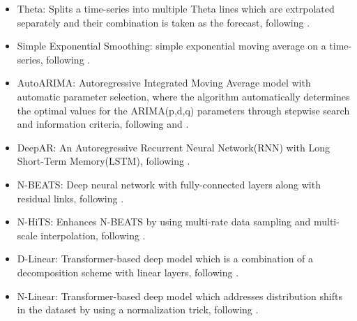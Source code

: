 \documentclass{article}
\begin{document}
\begin{itemize}
    \item Theta: Splits a time-series into multiple Theta lines which are extrpolated separately and their combination is taken as the forecast, following \cite{Assimakopoulos2000}.
    \item Simple Exponential Smoothing: simple exponential moving average on a time-series, following \cite{Brown2004}.
    \item AutoARIMA: Autoregressive Integrated Moving Average model with automatic parameter selection, where the algorithm automatically determines the optimal values for the ARIMA(p,d,q) parameters through stepwise search and information criteria, following \cite{Box2013} and \cite{Hyndman2008}.
    \item DeepAR: An Autoregressive Recurrent Neural Network(RNN) with Long Short-Term Memory(LSTM), following \cite{Salinas2020}.
    \item N-BEATS: Deep neural network with fully-connected layers along with residual links, following \cite{Oreshkin2020}.
    \item N-HiTS: Enhances N-BEATS by using multi-rate data sampling and multi-scale interpolation, following \cite{Challu2022}.
    \item D-Linear: Transformer-based deep model which is a combination of a decomposition scheme with linear layers, following \cite{Zeng2022}.
    \item N-Linear: Transformer-based deep model which addresses distribution shifts in the dataset by using a normalization trick, following \cite{Zeng2022}.

\end{itemize}
\end{document}
